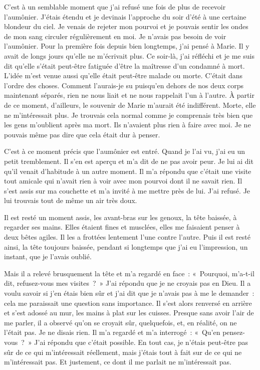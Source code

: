 \documentclass[french,twoside]{book} %
\begin{document}
C'est à un semblable moment que j’ai refusé une fois de plus de recevoir l’aumônier. J'étais étendu et je devinais l’approche du soir d’été à une certaine blondeur du ciel. Je venais de rejeter mon pourvoi et je pouvais sentir les ondes de mon sang circuler régulièrement en moi. Je n’avais pas besoin de voir l’aumônier. Pour la première fois depuis bien longtemps, j’ai pensé à Marie. Il y avait de longs jours qu’elle ne m’écrivait plus. Ce soir-là, j’ai réfléchi et je me suis dit qu’elle s’était peut-être fatiguée d’être la maîtresse d’un condamné à mort. L'idée m’est venue aussi qu’elle était peut-être malade ou morte. C'était dans l’ordre des choses. Comment l’aurais-je su puisqu’en dehors de nos deux corps maintenant séparés, rien ne nous liait et ne nous rappelait l’un à l’autre. À partir de ce moment, d’ailleurs, le souvenir de Marie m’aurait été indifférent. Morte, elle ne m’intéressait plus. Je trouvais cela normal comme je comprenais très bien que les gens m’oublient après ma mort. Ils n’avaient plus rien à faire avec moi. Je ne pouvais même pas dire que cela était dur à penser.\par
C'est à ce moment précis que l’aumônier est entré. Quand je l’ai vu, j’ai eu un petit tremblement. Il s’en est aperçu et m’a dit de ne pas avoir peur. Je lui ai dit qu’il venait d’habitude à un autre moment. Il m’a répondu que c’était une visite tout amicale qui n’avait rien à voir avec mon pourvoi dont il ne savait rien. Il s’est assis sur ma couchette et m’a invité à me mettre près de lui. J'ai refusé. Je lui trouvais tout de même un air très doux.\par
Il est resté un moment assis, les avant-bras sur les genoux, la tête baissée, à regarder ses mains. Elles étaient fines et musclées, elles me faisaient penser à deux bêtes agiles. Il les a frottées lentement l’une contre l’autre. Puis il est resté ainsi, la tête toujours baissée, pendant si longtemps que j’ai eu l’impression, un instant, que je l’avais oublié.\par
Mais il a relevé brusquement la tête et m’a regardé en face : « Pourquoi, m’a-t-il dit, refusez-vous mes visites ? » J'ai répondu que je ne croyais pas en Dieu. Il a voulu savoir si j’en étais bien sûr et j’ai dit que je n’avais pas à me le demander : cela me paraissait une question sans importance. Il s’est alors renversé en arrière et s’est adossé au mur, les mains à plat sur les cuisses. Presque sans avoir l’air de me parler, il a observé qu’on se croyait sûr, quelquefois, et, en réalité, on ne l’était pas. Je ne disais rien. Il m’a regardé et m’a interrogé : « Qu'en pensez-vous ? » J'ai répondu que c’était possible. En tout cas, je n’étais peut-être pas sûr de ce qui m’intéressait réellement, mais j’étais tout à fait sur de ce qui ne m’intéressait pas. Et justement, ce dont il me parlait ne m’intéressait pas.\par
\end{document}
